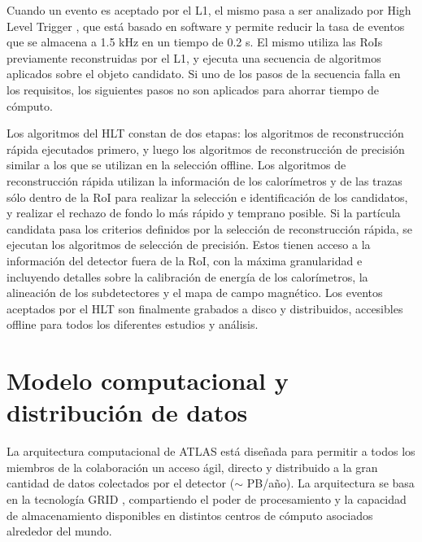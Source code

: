 Cuando un evento es aceptado por el L1, el mismo pasa a ser analizado por High Level Trigger \cite{ATLAS-TDR-16}, que está basado en software y permite reducir la tasa de eventos que se almacena a 1.5 kHz en un tiempo de 0.2 s. El mismo utiliza las RoIs previamente reconstruidas por el L1, y ejecuta una secuencia de algoritmos aplicados sobre el objeto candidato. Si uno de los pasos de la secuencia falla en los requisitos, los siguientes pasos no son aplicados para ahorrar tiempo de cómputo. 


Los algoritmos del HLT constan de dos etapas: los algoritmos de reconstrucción rápida ejecutados primero, y luego los algoritmos de reconstrucción de precisión similar a los que se utilizan en la selección offline. Los algoritmos de reconstrucción rápida utilizan la información de los calorímetros y de las trazas sólo dentro de la RoI para realizar la selección e identificación de los candidatos, y realizar el rechazo de fondo lo más rápido y temprano posible. Si la partícula candidata pasa los criterios definidos por la selección de reconstrucción rápida, se ejecutan los algoritmos de selección de precisión. Estos tienen acceso a la información del detector fuera de la RoI, con la máxima granularidad e incluyendo detalles sobre la calibración de energía de los calorímetros, la alineación de los subdetectores y el mapa de campo magnético. Los eventos aceptados por el HLT son finalmente grabados a disco y distribuidos, accesibles offline para todos los diferentes estudios y análisis.


\section{Modelo computacional y distribución de datos}\label{sec:lhc_samples}


La arquitectura computacional de ATLAS está diseñada para permitir a todos los miembros de la colaboración un acceso ágil, directo y distribuido a la gran cantidad de datos colectados por el detector ($\sim$ PB/año). La arquitectura se basa en la tecnología GRID \cite{grid}, compartiendo el poder de procesamiento y la capacidad de almacenamiento disponibles en distintos centros de cómputo asociados alrededor del
mundo.

